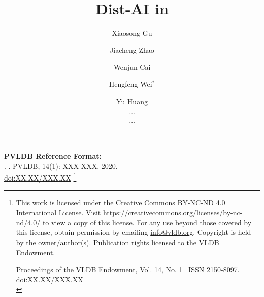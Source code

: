 \documentclass[sigconf, nonacm]{acmart}
\newcommand\vldbdoi{XX.XX/XXX.XX}
\newcommand\vldbpages{XXX-XXX}
\newcommand\vldbvolume{14}
\newcommand\vldbissue{1}
\newcommand\vldbyear{2020}
\newcommand\vldbauthors{\authors}
\newcommand\vldbtitle{\shorttitle}
\newcommand\vldbpagestyle{plain}
\begin{document}
\title{Dist-AI in \tlaplus}

\author{Xiaosong Gu}

\author{Jiacheng Zhao}

\author{Wenjun Cai}

\author{Hengfeng Wei$^*$}

\author{Yu Huang}

\author{$\dots$}
\affiliation{%
  \institution{}
}
\email{}

\author{$\dots$}
\affiliation{%
  \institution{}
}
\email{}



\maketitle

\pagestyle{\vldbpagestyle}
\begingroup\small\noindent\raggedright\textbf{PVLDB Reference Format:}\\
\vldbauthors. \vldbtitle. PVLDB, \vldbvolume(\vldbissue): \vldbpages, \vldbyear.\\
\href{https://doi.org/\vldbdoi}{doi:\vldbdoi}
\endgroup
\begingroup
\renewcommand\thefootnote{}\footnote{\noindent
This work is licensed under the Creative Commons BY-NC-ND 4.0 International License. Visit \url{https://creativecommons.org/licenses/by-nc-nd/4.0/} to view a copy of this license. For any use beyond those covered by this license, obtain permission by emailing \href{mailto:info@vldb.org}{info@vldb.org}. Copyright is held by the owner/author(s). Publication rights licensed to the VLDB Endowment. \\
\raggedright Proceedings of the VLDB Endowment, Vol. \vldbvolume, No. \vldbissue\ %
ISSN 2150-8097. \\
\href{https://doi.org/\vldbdoi}{doi:\vldbdoi} \\
}\addtocounter{footnote}{-1}\endgroup
\end{document}
